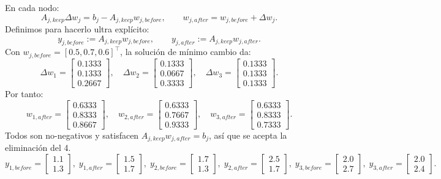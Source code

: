 \documentclass[11pt,a4paper]{article}
\begin{document}
En cada nodo:
\[
A_{j,keep}\Delta w_j=b_j-A_{j,keep}w_{j,before},
\qquad
w_{j,after}=w_{j,before}+\Delta w_j.
\]
Definimos para hacerlo ultra explícito:
\[
y_{j,before}:=A_{j,keep}w_{j,before},
\qquad
y_{j,after}:=A_{j,keep}w_{j,after}.
\]
Con $w_{j,before}=[0.5,0.7,0.6]^\top$, la solución de mínimo cambio da:
\[
\Delta w_1=
\begin{bmatrix}
0.1333\\0.1333\\0.2667
\end{bmatrix},\quad
\Delta w_2=
\begin{bmatrix}
0.1333\\0.0667\\0.3333
\end{bmatrix},\quad
\Delta w_3=
\begin{bmatrix}
0.1333\\0.1333\\0.1333
\end{bmatrix}.
\]
Por tanto:
\[
w_{1,after}=
\begin{bmatrix}
0.6333\\0.8333\\0.8667
\end{bmatrix},\quad
w_{2,after}=
\begin{bmatrix}
0.6333\\0.7667\\0.9333
\end{bmatrix},\quad
w_{3,after}=
\begin{bmatrix}
0.6333\\0.8333\\0.7333
\end{bmatrix}.
\]
Todos son no-negativos y satisfacen $A_{j,keep}w_{j,after}=b_j$, así que se acepta
la eliminación del 4.
\[
y_{1,before}=
\begin{bmatrix}
1.1\\1.3
\end{bmatrix},\;
y_{1,after}=
\begin{bmatrix}
1.5\\1.7
\end{bmatrix},\;
y_{2,before}=
\begin{bmatrix}
1.7\\1.3
\end{bmatrix},\;
y_{2,after}=
\begin{bmatrix}
2.5\\1.7
\end{bmatrix},\;
y_{3,before}=
\begin{bmatrix}
2.0\\2.7
\end{bmatrix},\;
y_{3,after}=
\begin{bmatrix}
2.0\\2.4
\end{bmatrix}.
\]
\end{document}
